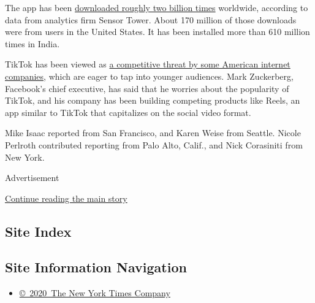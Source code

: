 The app has been
\href{https://sensortower.com/blog/tiktok-downloads-2-billion}{downloaded
roughly two billion times} worldwide, according to data from analytics
firm Sensor Tower. About 170 million of those downloads were from users
in the United States. It has been installed more than 610 million times
in India.

TikTok has been viewed as
\href{https://www.nytimes3xbfgragh.onion/2019/11/03/technology/tiktok-facebook-youtube.html}{a
competitive threat by some American internet companies}, which are eager
to tap into younger audiences. Mark Zuckerberg, Facebook's chief
executive, has said that he worries about the popularity of TikTok, and
his company has been building competing products like Reels, an app
similar to TikTok that capitalizes on the social video format.

Mike Isaac reported from San Francisco, and Karen Weise from Seattle.
Nicole Perlroth contributed reporting from Palo Alto, Calif., and Nick
Corasiniti from New York.

Advertisement

\protect\hyperlink{after-bottom}{Continue reading the main story}

\hypertarget{site-index}{%
\subsection{Site Index}\label{site-index}}

\hypertarget{site-information-navigation}{%
\subsection{Site Information
Navigation}\label{site-information-navigation}}

\begin{itemize}
\tightlist
\item
  \href{https://help.nytimes3xbfgragh.onion/hc/en-us/articles/115014792127-Copyright-notice}{©~2020~The
  New York Times Company}
\end{itemize}

